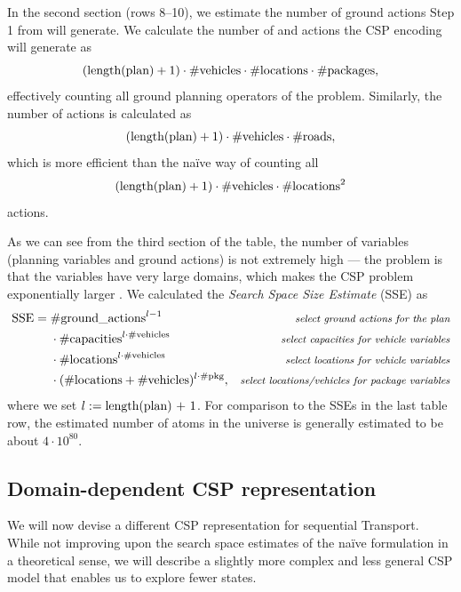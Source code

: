 In the second section (rows 8--10), we estimate the number of ground actions
Step 1 from \citet[Section~8.3.1]{Ghallab2004} will generate.
We calculate the number of \pickup{} and \drop{} actions the CSP encoding will generate
as $$(\textrm{length(plan)} + 1) \cdot \textrm{\#vehicles} \cdot \textrm{\#locations} \cdot \textrm{\#packages},$$
effectively counting all ground planning operators of the problem. Similarly,
the number of \drive{} actions is calculated as
$$(\textrm{length(plan)} + 1) \cdot \textrm{\#vehicles} \cdot \textrm{\#roads},$$
which is more efficient than the na{\"{i}}ve way of
counting all
$$(\textrm{length(plan)} + 1) \cdot \textrm{\#vehicles} \cdot \textrm{\#locations}^2$$
actions.

As we can see from the third section of the table, the number of variables
(planning variables and ground actions) is not extremely high
--- the problem is that the variables have very large domains,
which makes the CSP problem exponentially larger \citep[Section~8.3.2]{Ghallab2004}.
We calculated the \textit{Search Space Size Estimate} (SSE) as
\begin{align*}
\textrm{SSE} =\; &\textrm{\#ground\_actions}^{l-1} & \textit{\footnotesize select ground actions for the plan}\\
&\cdot \textrm{\#capacities}^{l \cdot \textrm{\#vehicles}} & \textit{\footnotesize select capacities for vehicle variables}\\
&\cdot \textrm{\#locations}^{l \cdot \textrm{\#vehicles}} & \textit{\footnotesize select locations for vehicle variables}\\
&\cdot (\textrm{\#locations} + \textrm{\#vehicles})^{l \cdot \textrm{\#pkg}}, & \textit{\footnotesize select locations/vehicles for package variables}
\end{align*}
where we set $l := \textrm{length(plan) + 1}$.
For comparison to the SSEs in the last table row, 
the estimated number of atoms in the universe is generally estimated to be about $4 \cdot 10^{80}$.

\subsection{Domain-dependent CSP representation}\label{csp-custom-repr}

We will now devise a different CSP representation for sequential Transport.
While not improving upon the search space estimates of the na{\"{i}}ve formulation
in a theoretical sense, we will describe a slightly more complex
and less general
CSP model that enables us to explore fewer states.

